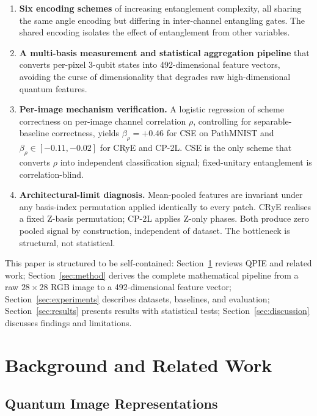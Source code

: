 \documentclass[conference,compsoc]{IEEEtran}
\begin{document}
\begin{enumerate}
    \item \textbf{Six encoding schemes} of increasing entanglement complexity, all sharing the same angle encoding but differing in inter-channel entangling gates. The shared encoding isolates the effect of entanglement from other variables.
    \item \textbf{A multi-basis measurement and statistical aggregation pipeline} that converts per-pixel 3-qubit states into 492-dimensional feature vectors, avoiding the curse of dimensionality that degrades raw high-dimensional quantum features.
    \item \textbf{Per-image mechanism verification.} A logistic regression of scheme correctness on per-image channel correlation $\rho$, controlling for separable-baseline correctness, yields $\beta_\rho = +0.46$ for CSE on PathMNIST and $\beta_\rho \in [-0.11, -0.02]$ for CRyE and CP-2L. CSE is the only scheme that converts $\rho$ into independent classification signal; fixed-unitary entanglement is correlation-blind.
    \item \textbf{Architectural-limit diagnosis.} Mean-pooled features are invariant under any basis-index permutation applied identically to every patch. CRyE realises a fixed Z-basis permutation; CP-2L applies Z-only phases. Both produce zero pooled signal by construction, independent of dataset. The bottleneck is structural, not statistical.
\end{enumerate}

This paper is structured to be self-contained: Section~\ref{sec:background} reviews QPIE and related work; Section~\ref{sec:method} derives the complete mathematical pipeline from a raw $28 \times 28$ RGB image to a 492-dimensional feature vector; Section~\ref{sec:experiments} describes datasets, baselines, and evaluation; Section~\ref{sec:results} presents results with statistical tests; Section~\ref{sec:discussion} discusses findings and limitations.

\section{Background and Related Work}
\label{sec:background}

\subsection{Quantum Image Representations}
\end{document}

